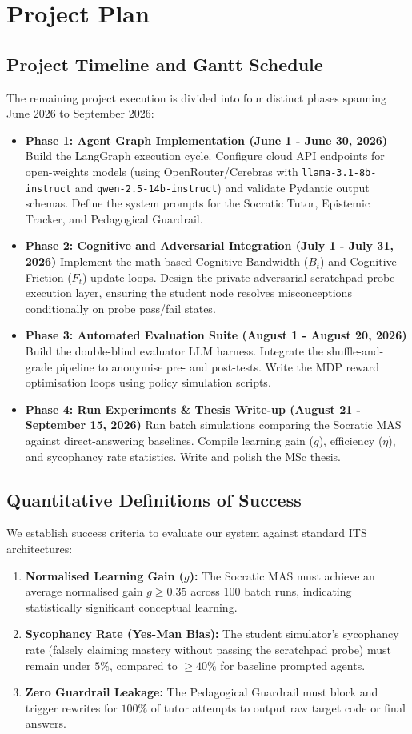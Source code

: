 \chapter{Project Plan}
\label{ch:plan}


\section{Project Timeline and Gantt Schedule}
The remaining project execution is divided into four distinct phases spanning June 2026 to September 2026:
\begin{itemize}
    \item \textbf{Phase 1: Agent Graph Implementation (June 1 - June 30, 2026)}
    Build the LangGraph execution cycle. Configure cloud API endpoints for open-weights models (using OpenRouter/Cerebras with \texttt{llama-3.1-8b-instruct} and \texttt{qwen-2.5-14b-instruct}) and validate Pydantic output schemas. Define the system prompts for the Socratic Tutor, Epistemic Tracker, and Pedagogical Guardrail.
    \item \textbf{Phase 2: Cognitive and Adversarial Integration (July 1 - July 31, 2026)}
    Implement the math-based Cognitive Bandwidth ($B_t$) and Cognitive Friction ($F_t$) update loops. Design the private adversarial scratchpad probe execution layer, ensuring the student node resolves misconceptions conditionally on probe pass/fail states.
    \item \textbf{Phase 3: Automated Evaluation Suite (August 1 - August 20, 2026)}
    Build the double-blind evaluator LLM harness. Integrate the shuffle-and-grade pipeline to anonymise pre- and post-tests. Write the MDP reward optimisation loops using policy simulation scripts.
    \item \textbf{Phase 4: Run Experiments \& Thesis Write-up (August 21 - September 15, 2026)}
    Run batch simulations comparing the Socratic MAS against direct-answering baselines. Compile learning gain ($g$), efficiency ($\eta$), and sycophancy rate statistics. Write and polish the MSc thesis.
\end{itemize}

\section{Quantitative Definitions of Success}
We establish success criteria to evaluate our system against standard ITS architectures:
\begin{enumerate}
    \item \textbf{Normalised Learning Gain ($g$):} The Socratic MAS must achieve an average normalised gain $g \ge 0.35$ across 100 batch runs, indicating statistically significant conceptual learning.
    \item \textbf{Sycophancy Rate (Yes-Man Bias):} The student simulator's sycophancy rate (falsely claiming mastery without passing the scratchpad probe) must remain under $5\%$, compared to $\ge 40\%$ for baseline prompted agents.
    \item \textbf{Zero Guardrail Leakage:} The Pedagogical Guardrail must block and trigger rewrites for $100\%$ of tutor attempts to output raw target code or final answers.
\end{enumerate}

